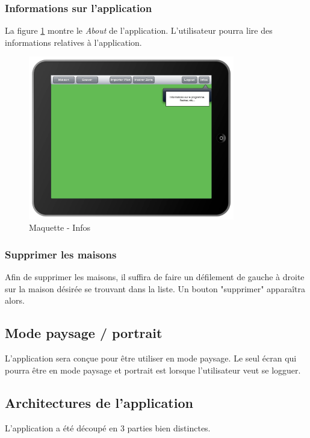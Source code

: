\subsubsection{Informations sur l'application}
La figure \ref{gra:maq12} montre le \emph{About} de l'application. L'utilisateur pourra lire des informations relatives à l'application.
\begin{figure}[H]
      \centering
      \includegraphics[width=9cm]{00_media/04_Maquette_12.pdf}
      \caption{Maquette - Infos}
      \label{gra:maq12}
\end{figure}

\subsubsection{Supprimer les maisons}

Afin de supprimer les maisons, il suffira de faire un défilement de gauche à droite sur la maison désirée se trouvant dans la liste. Un bouton "supprimer" apparaîtra alors.

\subsection{Mode paysage / portrait}
L'application sera conçue pour être utiliser en mode paysage. Le seul écran qui pourra être en mode paysage et portrait est lorsque l'utilisateur veut se logguer.

\subsection{Architectures de l'application} %
\label{sub:architectures_de_l_application}

L'application a été découpé en 3 parties bien distinctes.

\medskip

